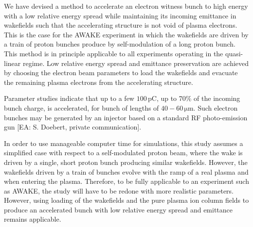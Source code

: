 \documentclass[aps,prstab,reprint,amsmath,amssymb,groupedaddress,onecolumn]{revtex4-1}
\newcommand{\unit}[1]{\,\mathrm{#1}}
\begin{document}


We have devised a method to accelerate an electron witness bunch to high energy with a low relative energy spread while maintaining its incoming emittance in wakefields such that the accelerating structure is not void of plasma electrons. This is the case for the AWAKE experiment in which the wakefields are driven by a train of proton bunches produce by self-modulation of a long proton bunch. This method is in principle applicable to all experiments operating in the quasi-linear regime. Low relative energy spread and emittance preservation are achieved by choosing the electron beam parameters to load the wakefields and evacuate the remaining plasma electrons from the accelerating structure.
 
Parameter studies indicate that up to a few $100\unit{pC}$, up to 70\% of the incoming bunch charge, is accelerated, for bunch of lengths of $40-60\unit{\mu m}$. Such electron bunches may be generated by an injector based on a standard RF photo-emission gun [EA: S. Doebert, private communication].

In order to use manageable computer time for simulations, this study assumes a simplified case with respect to a self-modulated proton beam, where the wake is driven by a single, short proton bunch producing similar wakefields. However, the wakefields driven by a train of bunches evolve with the ramp of a real plasma and when entering the plasma. Therefore, to be fully applicable to an experiment such as AWAKE, the study will have to be redone with more realistic parameters. However, using loading of the wakefields and the pure plasma ion column fields to produce an accelerated bunch with low relative energy spread and emittance remains applicable. 
\end{document}
